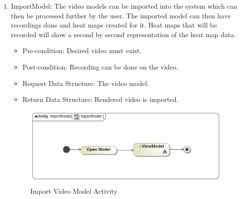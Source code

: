 		\begin{enumerate}
			\item{ImportModel:}
			\newline
			The video models can be imported into the system which can then be processed further by the user. The imported model can then have recordings done and heat maps created for it. Heat maps that will be recorded will show a second by second representation of the heat map data.
			\begin{itemize}
				\item Pre-condition: Desired video must exist.
				\item Post-condition: Recording can be done on the video.
				\item Request Data Structure: The video model.
				\item Return Data Structure: Rendered video is imported.
			\end{itemize}
			
			\begin{figure}[!ht]
				\centering
				\includegraphics[scale=0.5]{Diagrams/Activity_Diagram__ImportModel__ImportModel.png}
				\caption{Import Video Model Activity}
			\end{figure}
			

\end{enumerate}
